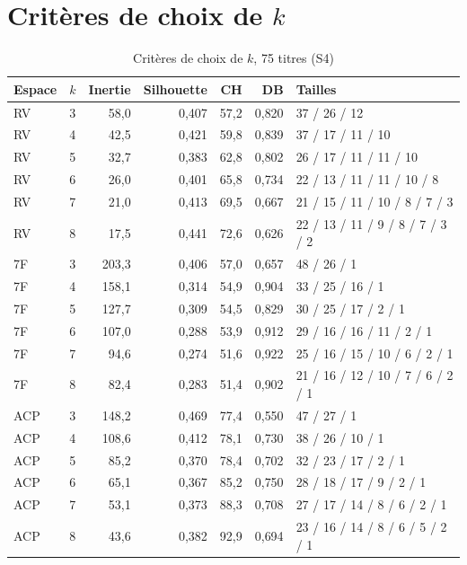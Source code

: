 \documentclass[11pt,a4paper]{article}
\begin{document}
\section{Critères de choix de \texorpdfstring{$k$}{k}}\label{ann:criteres}
\begin{table}[H]\centering\small
\caption{Critères de choix de $k$, 75 titres (S4)}\label{tab:annexe-k75}
\begin{tabular}{llrrrrl}\toprule
Espace & $k$ & Inertie & Silhouette & CH & DB & Tailles \\ \midrule
RV & 3 & 58{,}0 & 0{,}407 & 57{,}2 & 0{,}820 & 37 / 26 / 12 \\
RV & 4 & 42{,}5 & 0{,}421 & 59{,}8 & 0{,}839 & 37 / 17 / 11 / 10 \\
RV & 5 & 32{,}7 & 0{,}383 & 62{,}8 & 0{,}802 & 26 / 17 / 11 / 11 / 10 \\
RV & 6 & 26{,}0 & 0{,}401 & 65{,}8 & 0{,}734 & 22 / 13 / 11 / 11 / 10 / 8 \\
RV & 7 & 21{,}0 & 0{,}413 & 69{,}5 & 0{,}667 & 21 / 15 / 11 / 10 / 8 / 7 / 3 \\
RV & 8 & 17{,}5 & 0{,}441 & 72{,}6 & 0{,}626 & 22 / 13 / 11 / 9 / 8 / 7 / 3 / 2 \\
\midrule
7F & 3 & 203{,}3 & 0{,}406 & 57{,}0 & 0{,}657 & 48 / 26 / 1 \\
7F & 4 & 158{,}1 & 0{,}314 & 54{,}9 & 0{,}904 & 33 / 25 / 16 / 1 \\
7F & 5 & 127{,}7 & 0{,}309 & 54{,}5 & 0{,}829 & 30 / 25 / 17 / 2 / 1 \\
7F & 6 & 107{,}0 & 0{,}288 & 53{,}9 & 0{,}912 & 29 / 16 / 16 / 11 / 2 / 1 \\
7F & 7 & 94{,}6 & 0{,}274 & 51{,}6 & 0{,}922 & 25 / 16 / 15 / 10 / 6 / 2 / 1 \\
7F & 8 & 82{,}4 & 0{,}283 & 51{,}4 & 0{,}902 & 21 / 16 / 12 / 10 / 7 / 6 / 2 / 1 \\
\midrule
ACP & 3 & 148{,}2 & 0{,}469 & 77{,}4 & 0{,}550 & 47 / 27 / 1 \\
ACP & 4 & 108{,}6 & 0{,}412 & 78{,}1 & 0{,}730 & 38 / 26 / 10 / 1 \\
ACP & 5 & 85{,}2 & 0{,}370 & 78{,}4 & 0{,}702 & 32 / 23 / 17 / 2 / 1 \\
ACP & 6 & 65{,}1 & 0{,}367 & 85{,}2 & 0{,}750 & 28 / 18 / 17 / 9 / 2 / 1 \\
ACP & 7 & 53{,}1 & 0{,}373 & 88{,}3 & 0{,}708 & 27 / 17 / 14 / 8 / 6 / 2 / 1 \\
ACP & 8 & 43{,}6 & 0{,}382 & 92{,}9 & 0{,}694 & 23 / 16 / 14 / 8 / 6 / 5 / 2 / 1 \\
\bottomrule\end{tabular}\end{table}
\end{document}
